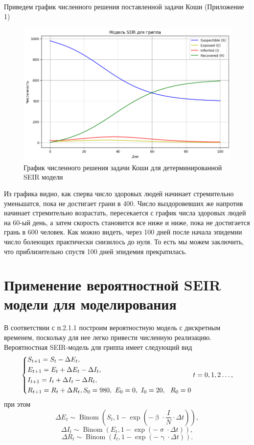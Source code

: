 \documentclass[a4paper, 14pt]{extreport}
\numberwithin{equation}{section}
\renewcommand{\beta}{\upbeta}
\renewcommand{\gamma}{\upgamma}
\renewcommand{\sigma}{\upsigma}
\newcommand{\Binom}{\operatorname{Binom}}
\begin{document}
	 Приведем график численного решения поставленной задачи Коши (Приложение 1)
	 
	 \begin{figure}[h]
	 	\centering
	 	\includegraphics[scale=0.6]{images/graph01}
	 	\caption{График численного решения задачи Коши для детерминированной SEIR модели}
	 	\label{fig:graph01}
	 \end{figure}
	 
	 Из графика видно, как сперва число здоровых людей начинает стремительно уменьшатся, пока не достигает грани в 400. Число выздоровевших же напротив начинает стремительно возрастать, пересекается с график числа здоровых людей на 60-ый день, а затем скорость становится все ниже и ниже, пока не достигается грань в 600 человек. Как можно видеть, через 100 дней после начала эпидемии число болеющих практически снизилось до нуля. То есть мы можем заключить, что приблизительно спустя 100 дней эпидемия прекратилась.
	\section{Применение вероятностной SEIR модели для моделирования}
	В соответствии с п.2.1.1 построим вероятностную модель с дискретным временем, поскольку для нее легко привести численную реализацию. Вероятностная SEIR-модель для гриппа имеет следующий вид
	\begin{equation}
		\begin{dcases}
			S_{t+1} = S_t - \Delta E_t,\\
			E_{t+1} = E_t +\Delta E_t - \Delta I_t,\\
			I_{t+1} = I_t + \Delta I_t - \Delta R_t,\\
			R_{t+1} = R_t + \Delta R_t,
			S_0 = 980,\ E_0 = 0,\ I_0 = 20,\ \ R_0 = 0
		\end{dcases}
		t = 0,1,2\ldots,
	\end{equation}
	при этом
	$$\Delta E_t \sim \Binom\left(S_t, 
	1 - \exp\left(-\beta\cdot  \frac{I}{N} \cdot \Delta t\right)\right),$$
	$$\Delta I_t \sim \Binom\left(E_t, 1 - \exp\left(-\sigma \cdot \Delta t\right)\right),$$
	$$\Delta R_t \sim \Binom\left(I_t, 1 - \exp\left(-\gamma \cdot \Delta t\right)\right).$$
	
\end{document}
